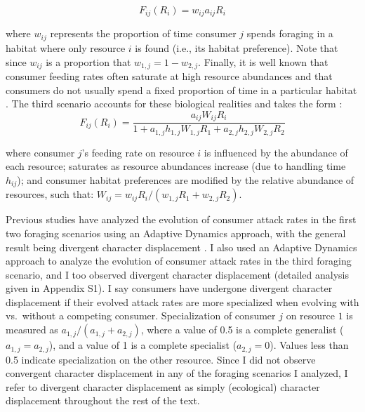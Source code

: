 \documentclass[11pt,]{article}
\begin{document}
\begin{equation} \label{eq:3}
  F_{ij}(R_i)=w_{ij}a_{ij}R_i
\end{equation}

where \(w_{ij}\) represents the proportion of time consumer \(j\) spends
foraging in a habitat where only resource \(i\) is found (i.e., its
habitat preference). Note that since \(w_{ij}\) is a proportion that
\(w_{1,j}=1-w_{2,j}\). Finally, it is well known that consumer feeding
rates often saturate at high resource abundances
\citep{Holling1959, Rosenzweig1963, Murdoch2003, McCann2011} and that
consumers do not usually spend a fixed proportion of time in a
particular habitat \citep{McCann2005}. The third scenario accounts for
these biological realities and takes the form \citep[derived
by][]{McCann2005}:\\

\begin{equation} \label{eq:4}
  F_{ij}(R_i)=\frac{a_{ij}W_{ij}R_i}{1+a_{1,j}h_{1,j}W_{1,j}R_1+a_{2,j}h_{2,j}W_{2,j}R_2}
\end{equation}

where consumer \(j\)'s feeding rate on resource \(i\) is influenced by
the abundance of each resource; saturates as resource abundances
increase (due to handling time \(h_{ij}\)); and consumer habitat
preferences are modified by the relative abundance of resources, such
that: \(W_{ij}=w_{ij}R_i/(w_{1,j}R_1+w_{2,j}R_2)\).

Previous studies have analyzed the evolution of consumer attack rates in
the first two foraging scenarios using an Adaptive Dynamics approach,
with the general result being divergent character displacement
\citep{Lawlor1976, Abrams1986}. I also used an Adaptive Dynamics
approach to analyze the evolution of consumer attack rates in the third
foraging scenario, and I too observed divergent character displacement
(detailed analysis given in Appendix S1). I say consumers have undergone
divergent character displacement if their evolved attack rates are more
specialized when evolving with vs.~without a competing consumer.
Specialization of consumer \(j\) on resource \(1\) is measured as
\(a_{1,j}/(a_{1,j}+a_{2,j})\), where a value of 0.5 is a complete
generalist (\(a_{1,j}=a_{2,j}\)), and a value of 1 is a complete
specialist (\(a_{2,j}=0\)). Values less than 0.5 indicate specialization
on the other resource. Since I did not observe convergent character
displacement in any of the foraging scenarios I analyzed, I refer to
divergent character displacement as simply (ecological) character
displacement throughout the rest of the text.
\end{document}
